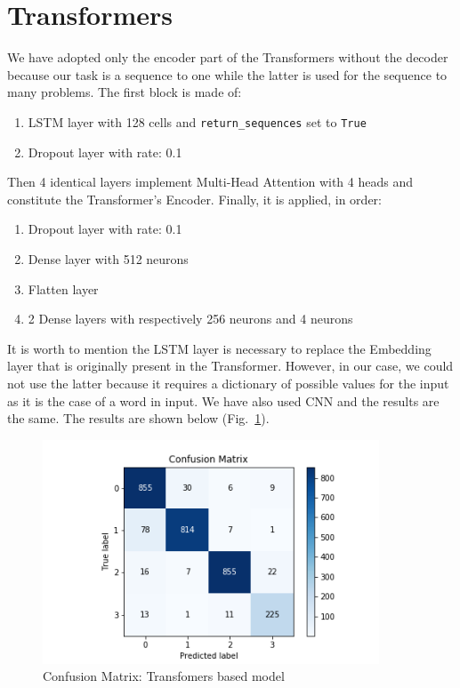\documentclass[LaM,binding=0.6cm]{sapthesis}
\begin{document}
\section{Transformers}
\label{sec:trasfsection}
We have adopted only the encoder part of the Transformers without the decoder because our task is a sequence to one while the latter is used for the sequence to many problems. The first block is made of:
\begin{enumerate}
\item LSTM layer with 128 cells and \texttt{return\_sequences} set to \texttt{True}
\item Dropout layer with rate: 0.1
\end{enumerate}
Then 4 identical layers implement Multi-Head Attention with 4 heads and constitute the Transformer's Encoder. Finally, it is applied, in order:
\begin{enumerate}
\item Dropout layer with rate: 0.1
\item Dense layer with 512 neurons
\item Flatten layer
\item 2 Dense layers with respectively 256 neurons and 4 neurons
\end{enumerate}
It is worth to mention the LSTM layer is necessary to replace the Embedding layer that is originally present in the Transformer. However, in our case, we could not use the latter because it requires a dictionary of possible values for the input as it is the case of a word in input. We have also used CNN and the results are the same.
The results are shown below (Fig.~\ref{fig:transf}).
\begin{figure}  \centering
    \includegraphics[width=100mm,scale=0.7]{transf}
    \caption{Confusion Matrix: Transfomers based model }
    \label{fig:transf}
\end{figure}
\end{document}
